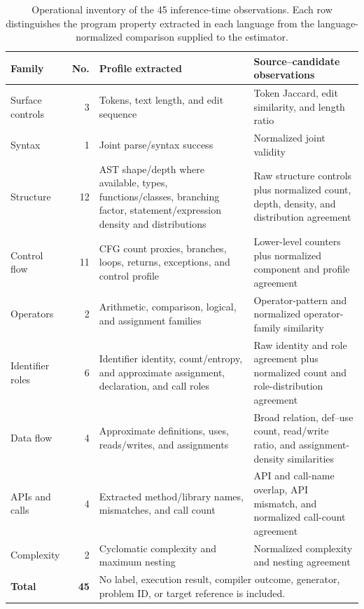 \documentclass[conference]{IEEEtran}
\begin{document}
\begin{table}[t]
\centering
\caption{Operational inventory of the 45 inference-time observations. Each row distinguishes the program property extracted in each language from the language-normalized comparison supplied to the estimator.}
\label{tab:inventory}
\begin{tabular}{@{}p{}rp{}p{}@{}}
\toprule
Family & No. & Profile extracted & Source--candidate observations \\
\midrule
Surface controls & 3 & Tokens, text length, and edit sequence & Token Jaccard, edit similarity, and length ratio \\
Syntax & 1 & Joint parse/syntax success & Normalized joint validity \\
Structure & 12 & AST shape/depth where available, types, functions/classes, branching factor, statement/expression density and distributions & Raw structure controls plus normalized count, depth, density, and distribution agreement \\
Control flow & 11 & CFG count proxies, branches, loops, returns, exceptions, and control profile & Lower-level counters plus normalized component and profile agreement \\
Operators & 2 & Arithmetic, comparison, logical, and assignment families & Operator-pattern and normalized operator-family similarity \\
Identifier roles & 6 & Identifier identity, count/entropy, and approximate assignment, declaration, and call roles & Raw identity and role agreement plus normalized count and role-distribution agreement \\
Data flow & 4 & Approximate definitions, uses, reads/writes, and assignments & Broad relation, def--use count, read/write ratio, and assignment-density similarities \\
APIs and calls & 4 & Extracted method/library names, mismatches, and call count & API and call-name overlap, API mismatch, and normalized call-count agreement \\
Complexity & 2 & Cyclomatic complexity and maximum nesting & Normalized complexity and nesting agreement \\
\midrule
\textbf{Total} & \textbf{45} & \multicolumn{2}{l}{No label, execution result, compiler outcome, generator, problem ID, or target reference is included.} \\
\bottomrule
\end{tabular}
\end{table}
\end{document}
